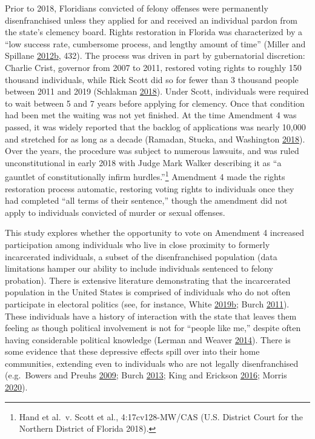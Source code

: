 \documentclass[
  12pt,
]{article}
\begin{document}
Prior to 2018, Floridians convicted of felony offenses were permanently disenfranchised unless they applied for and received an individual pardon from the state's clemency board. Rights restoration in Florida was characterized by a ``low success rate, cumbersome process, and lengthy amount of time'' (Miller and Spillane \protect\hyperlink{ref-Miller2012a}{2012}\protect\hyperlink{ref-Miller2012a}{b}, 432). The process was driven in part by gubernatorial discretion: Charlie Crist, governor from 2007 to 2011, restored voting rights to roughly 150 thousand individuals, while Rick Scott did so for fewer than 3 thousand people between 2011 and 2019 (Schlakman \protect\hyperlink{ref-Schlakman2018}{2018}). Under Scott, individuals were required to wait between 5 and 7 years before applying for clemency. Once that condition had been met the waiting was not yet finished. At the time Amendment 4 was passed, it was widely reported that the backlog of applications was nearly 10,000 and stretched for as long as a decade (Ramadan, Stucka, and Washington \protect\hyperlink{ref-Ramadan2018}{2018}). Over the years, the procedure was subject to numerous lawsuits, and was ruled unconstitutional in early 2018 with Judge Mark Walker describing it as ``a gauntlet of constitutionally infirm hurdles.''\footnote{Hand et al.~v. Scott et al., 4:17cv128-MW/CAS (U.S. District Court for the Northern District of Florida 2018).} Amendment 4 made the rights restoration process automatic, restoring voting rights to individuals once they had completed ``all terms of their sentence,'' though the amendment did not apply to individuals convicted of murder or sexual offenses.

This study explores whether the opportunity to vote on Amendment 4 increased participation among individuals who live in close proximity to formerly incarcerated individuals, a subset of the disenfranchised population (data limitations hamper our ability to include individuals sentenced to felony probation). There is extensive literature demonstrating that the incarcerated population in the United States is comprised of individuals who do not often participate in electoral politics (see, for instance, White \protect\hyperlink{ref-White2019}{2019}\protect\hyperlink{ref-White2019}{b}; Burch \protect\hyperlink{ref-Burch2011}{2011}). These individuals have a history of interaction with the state that leaves them feeling as though political involvement is not for ``people like me,'' despite often having considerable political knowledge (Lerman and Weaver \protect\hyperlink{ref-Lerman2014}{2014}). There is some evidence that these depressive effects spill over into their home communities, extending even to individuals who are not legally disenfranchised (e.g.~Bowers and Preuhs \protect\hyperlink{ref-Bowers2009}{2009}; Burch \protect\hyperlink{ref-Burch2013}{2013}; King and Erickson \protect\hyperlink{ref-King2016}{2016}; Morris \protect\hyperlink{ref-Morris2020}{2020}).
\end{document}
